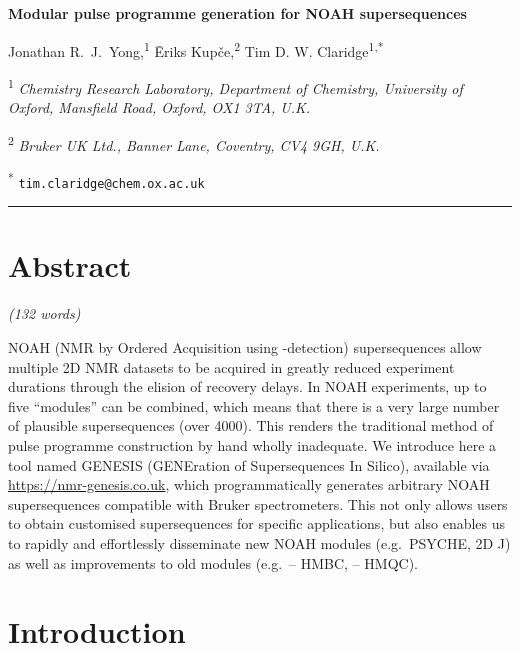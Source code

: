 \documentclass[a4paper,11pt]{article}
\newcommand{\proton}{\ce{^{1}H}}
\newcommand{\carbon}{\ce{^{13}C}}
\newcommand{\nitrogen}{\ce{^{15}N}}
\newcommand{\CH}{\carbon{}--\proton{}}
\newcommand{\NH}{\nitrogen{}--\proton{}}
\newcommand{\theurl}{\url{https://nmr-genesis.co.uk}}
\begin{document}
\begin{center}   %
    \textbf{\Large Modular pulse programme generation for NOAH supersequences}

    \vspace{0.2cm}

    Jonathan R.\ J.\ Yong,\textsuperscript{1} {\=E}riks Kup{\v{c}}e,\textsuperscript{2} Tim D. W. Claridge\textsuperscript{1,*}

    \vspace{0.2cm}

    \textsuperscript{1} \textit{Chemistry Research Laboratory, Department of Chemistry, University of Oxford, Mansfield Road, Oxford, OX1 3TA, U.K.}

    \textsuperscript{2} \textit{Bruker UK Ltd., Banner Lane, Coventry, CV4 9GH, U.K.}

    \textsuperscript{*} \texttt{tim.claridge@chem.ox.ac.uk}

    \vspace{0.5cm} \hrule
\end{center}
\section*{Abstract}

\textit{(132 words)}

NOAH (NMR by Ordered Acquisition using \proton{}-detection) supersequences allow multiple 2D NMR datasets to be acquired in greatly reduced experiment durations through the elision of recovery delays.
In NOAH experiments, up to five ``modules'' can be combined, which means that there is a very large number of plausible supersequences (over 4000).
This renders the traditional method of pulse programme construction by hand wholly inadequate.
We introduce here a tool named GENESIS (GENEration of Supersequences In Silico), available via \theurl{}, which programmatically generates arbitrary NOAH supersequences compatible with Bruker spectrometers.
This not only allows users to obtain customised supersequences for specific applications, but also enables us to rapidly and effortlessly disseminate new NOAH modules (e.g.\ PSYCHE, 2D J) as well as improvements to old modules (e.g.\ \CH{} HMBC, \NH{} HMQC).

\section{Introduction}
\end{document}
